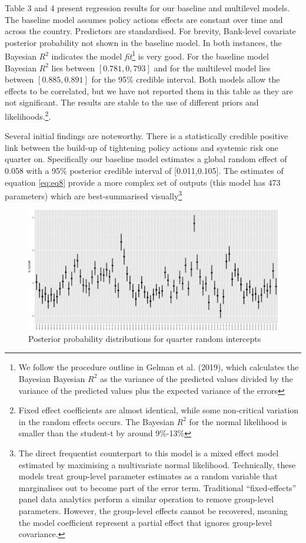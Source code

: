 \documentclass[
  10pt,
]{article}
\begin{document}
Table 3 and 4 present regression results for our baseline and multilevel
models. The baseline model assumes policy actions effects are constant
over time and across the country. Predictors are standardised. For
brevity, Bank-level covariate posterior probability not shown in the
baseline model. In both instances, the Bayesian \(R^2\) indicates the
model \emph{fit}\footnote{We follow the procedure outline in Gelman et
  al. (2019), which calculates the Bayesian Bayesian \(R^2\) as the
  variance of the predicted values divided by the variance of the
  predicted values plus the expected variance of the errors} is very
good. For the baseline model Bayesian \(R^2\) lies between
\([0.781,0,793]\) and for the multilevel model lies between
\([0.885,0.891]\) for the 95\% credible interval. Both models allow the
effects to be correlated, but we have not reported them in this table as
they are not significant. The results are stable to the use of different
priors and likelihoods.\footnote{Fixed effect coefficients are almost
  identical, while some non-critical variation in the random effects
  occurs. The Bayesian \(R^2\) for the normal likelihood is smaller than
  the student-t by around 9\%-13\%}.

Several initial findings are noteworthy. There is a statistically
credible positive link between the build-up of tightening policy actions
and systemic risk one quarter on. Specifically our baseline model
estimates a global random effect of 0.058 with a 95\% posterior credible
interval of {[}0.011,0.105{]}. The estimates of equation \ref{eq:eq8}
provide a more complex set of outputs (this model has 473 parameters)
which are best-summarised visually\footnote{The direct frequentist
  counterpart to this model is a mixed effect model estimated by
  maximising a multivariate normal likelihood. Technically, these models
  treat group-level parameter estimates as a random variable that
  marginalises out to become part of the error term. Traditional
  ``fixed-effects'' panel data analytics perform a similar operation to
  remove group-level parameters. However, the group-level effects cannot
  be recovered, meaning the model coefficient represent a partial effect
  that ignores group-level covariance.}

\begin{figure}
\centering
\includegraphics{figures/paper-fig3-1.png}
\caption{Posterior probability distributions for quarter random
intercepts}
\end{figure}
\end{document}
